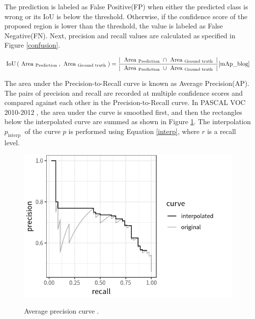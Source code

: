 \documentclass[english, 12pt, a4paper, elec, utf8, a-1b, online]{aaltothesis}
\begin{document}
The prediction is labeled as False Positive(FP) when either the predicted class is wrong or its IoU is below the threshold. Otherwise, if the confidence score of the proposed region is lower than the threshold, the value is labeled as False Negative(FN). Next, precision and recall values are calculated as specified in Figure \ref{confusion}.

\begin{equation}
\operatorname{IoU}\left(\text { Area }_{\text {Prediction }}, \text { Area }_{\text {Ground truth }}\right)=\frac{\mid \text { Area }_{\text {Prediction }} \cap \text { Area }_{\text {Ground truth }} \mid}{\mid \text { Area }_{\text {Prediction }} \cup \text { Area }_{\text {Ground truth }} \mid}
\label{iou} 
\cite{mAp_blog} 
\end{equation}

The area under the Precision-to-Recall curve is known as Average Precision(AP). The pairs of precision and recall are recorded at multiple confidence scores and compared against each other in the Precision-to-Recall curve. In PASCAL VOC 2010-2012 \cite{Everingham10}, the area under the curve is smoothed first, and then the rectangles below the interpolated curve are summed as shown in Figure \ref{AUC}. The interpolation $p_{\text {interp }}$ of the curve $p$ is performed using Equation \ref{interp}, where $r$ is a recall level. 

\begin{figure}[htb]
	\begin{center}
		\includegraphics[width=12cm]{./AUC.png}
	\end{center}
	\caption{Average precision curve \cite{mAp_blog}.}
	\begin{center}
		\label{AUC}
	\end{center}
\end{figure}
\FloatBarrier
\end{document}
